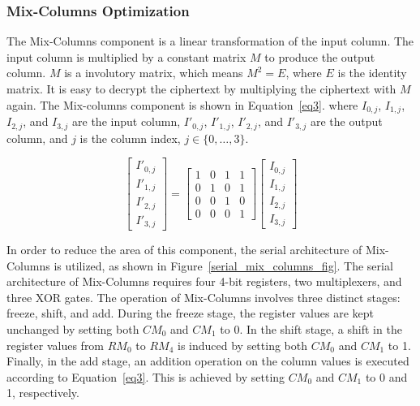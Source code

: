 \documentclass[final,5p,times,twocolumn]{elsarticle}
\begin{document}
\subsubsection{Mix-Columns Optimization}\label{subsubsec2}

The Mix-Columns component is a linear transformation of the input column.
The input column is multiplied by a constant matrix $M$ to produce the output column.
$M$ is a involutory matrix, which means $M^2 = E$, where $E$ is the identity matrix.
It is easy to decrypt the ciphertext by multiplying the ciphertext with $M$ again.
The Mix-columns component is shown in Equation~\ref{eq3}.
where $I_{0,j}$, $I_{1,j}$, $I_{2,j}$, and $I_{3,j}$ are the input column, $I'_{0,j}$, $I'_{1,j}$, $I'_{2,j}$, and $I'_{3,j}$ are the output column, and $j$ is the column index, $j \in \{0,\dots,3\}$.

\begin{equation}
    \begin{bmatrix}
        I'_{0,j} \\
        I'_{1,j} \\
        I'_{2,j} \\
        I'_{3,j}
    \end{bmatrix}
    =
    \begin{bmatrix}
        1 & 0 & 1 & 1 \\
        0 & 1 & 0 & 1 \\
        0 & 0 & 1 & 0 \\
        0 & 0 & 0 & 1
    \end{bmatrix}
    \begin{bmatrix}
        I_{0,j} \\
        I_{1,j} \\
        I_{2,j} \\
        I_{3,j}
    \end{bmatrix}
    \label{eq3}
\end{equation}


In order to reduce the area of this component, the serial architecture of Mix-Columns is utilized, as shown in Figure~\ref{serial_mix_columns_fig}.
The serial architecture of Mix-Columns requires four 4-bit registers, two multiplexers, and three XOR gates.
The operation of Mix-Columns involves three distinct stages: freeze, shift, and add.
During the freeze stage, the register values are kept unchanged by setting both $CM_0$ and $CM_1$ to 0.
In the shift stage, a shift in the register values from $RM_0$ to $RM_4$ is induced by setting both $CM_0$ and $CM_1$ to 1.
Finally, in the add stage, an addition operation on the column values is executed according to Equation~\ref{eq3}. This is achieved by setting $CM_0$ and $CM_1$ to 0 and 1, respectively.
\end{document}
